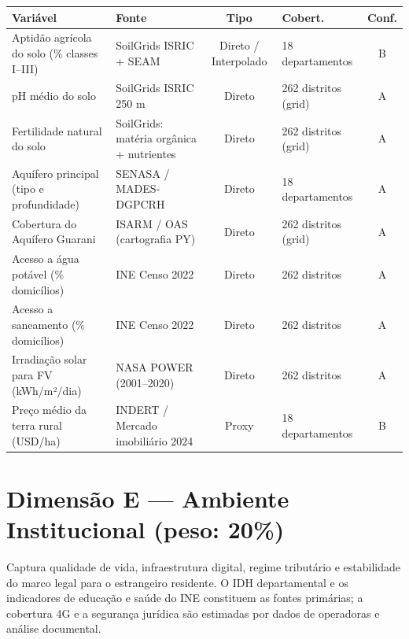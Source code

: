 \medskip
{\footnotesize\renewcommand{\arraystretch}{1.2}
\begin{tabular}{@{}p{2.5cm} p{2.8cm} c p{1.8cm} c@{}}
\toprule
\textbf{Variável} & \textbf{Fonte} & \textbf{Tipo} & \textbf{Cobert.} & \textbf{Conf.} \\
\midrule
Aptidão agrícola do solo (\% classes I--III) &
  SoilGrids ISRIC + SEAM &
  Direto / Interpolado &
  18 departamentos &
  B \\
\midrule
pH médio do solo &
  SoilGrids ISRIC 250 m &
  Direto &
  262 distritos (grid) &
  A \\
\midrule
Fertilidade natural do solo &
  SoilGrids: matéria orgânica + nutrientes &
  Direto &
  262 distritos (grid) &
  A \\
\midrule
Aquífero principal (tipo e profundidade) &
  SENASA / MADES-DGPCRH &
  Direto &
  18 departamentos &
  A \\
\midrule
Cobertura do Aquífero Guarani &
  ISARM / OAS (cartografia PY) &
  Direto &
  262 distritos (grid) &
  A \\
\midrule
Acesso a água potável (\% domicílios) &
  INE Censo 2022 &
  Direto &
  262 distritos &
  A \\
\midrule
Acesso a saneamento (\% domicílios) &
  INE Censo 2022 &
  Direto &
  262 distritos &
  A \\
\midrule
Irradiação solar para FV (kWh/m²/dia) &
  NASA POWER (2001--2020) &
  Direto &
  262 distritos &
  A \\
\midrule
Preço médio da terra rural (USD/ha) &
  INDERT / Mercado imobiliário 2024 &
  Proxy &
  18 departamentos &
  B \\
\bottomrule
\end{tabular}%
}

\section*{Dimensão E — Ambiente Institucional (peso: 20\%)}
\label{apendice:variaveis:dimE}

Captura qualidade de vida, infraestrutura digital, regime tributário e
estabilidade do marco legal para o estrangeiro residente. O IDH
departamental e os indicadores de educação e saúde do INE constituem as
fontes primárias; a cobertura 4G e a segurança jurídica são estimadas por
dados de operadoras e análise documental.

